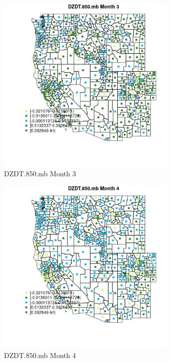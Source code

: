 \begin{figure} 
\centering  
\includegraphics[width=0.77\textwidth]{Code_Outputs/df_report_ML_predictors_CountyCentroid_Locations_Dates_2008-01-01to2018-12-31_MapObsMo3DZDT850mb.jpg} 
\caption{\label{fig:df_report_ML_predictors_CountyCentroid_Locations_Dates_2008-01-01to2018-12-31MapObsMo3DZDT850mb}DZDT.850.mb Month 3} 
\end{figure} 
 

\begin{figure} 
\centering  
\includegraphics[width=0.77\textwidth]{Code_Outputs/df_report_ML_predictors_CountyCentroid_Locations_Dates_2008-01-01to2018-12-31_MapObsMo4DZDT850mb.jpg} 
\caption{\label{fig:df_report_ML_predictors_CountyCentroid_Locations_Dates_2008-01-01to2018-12-31MapObsMo4DZDT850mb}DZDT.850.mb Month 4} 
\end{figure} 
 

